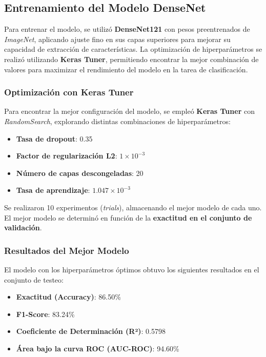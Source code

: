 \subsection{Entrenamiento del Modelo DenseNet}

Para entrenar el modelo, se utilizó \textbf{DenseNet121} con pesos preentrenados de
\textit{ImageNet}, aplicando ajuste fino en sus capas superiores para mejorar su
capacidad de extracción de características. La optimización de hiperparámetros se
realizó utilizando \textbf{Keras Tuner}, permitiendo encontrar la mejor combinación
de valores para maximizar el rendimiento del modelo en la tarea de clasificación.

\subsubsection{Optimización con Keras Tuner}
Para encontrar la mejor configuración del modelo, se empleó \textbf{Keras Tuner} con \textit{RandomSearch}, explorando distintas combinaciones de hiperparámetros:

\begin{itemize}
    \item \textbf{Tasa de dropout}: 0.35
    \item \textbf{Factor de regularización L2}: $1 \times 10^{-3}$
    \item \textbf{Número de capas descongeladas}: 20
    \item \textbf{Tasa de aprendizaje}: $1.047 \times 10^{-3}$
\end{itemize}

Se realizaron 10 experimentos (\textit{trials}), almacenando el mejor modelo de
cada uno. El mejor modelo se determinó en función de la \textbf{exactitud en el
conjunto de validación}.

\subsubsection{Resultados del Mejor Modelo}
El modelo con los hiperparámetros óptimos obtuvo los siguientes resultados en el
conjunto de testeo:

\begin{itemize}
    \item \textbf{Exactitud (Accuracy)}: 86.50\%
    \item \textbf{F1-Score}: 83.24\%
    \item \textbf{Coeficiente de Determinación (R²)}: 0.5798
    \item \textbf{Área bajo la curva ROC (AUC-ROC)}: 94.60\%
\end{itemize}

